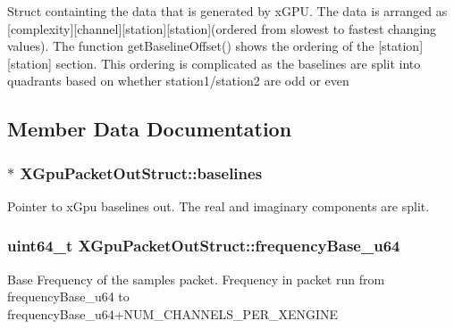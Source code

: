 Struct containting the data that is generated by x\+G\+PU. The data is arranged as \mbox{[}complexity\mbox{]}\mbox{[}channel\mbox{]}\mbox{[}station\mbox{]}\mbox{[}station\mbox{]}(ordered from slowest to fastest changing values). The function get\+Baseline\+Offset() shows the ordering of the \mbox{[}station\mbox{]}\mbox{[}station\mbox{]} section. This ordering is complicated as the baselines are split into quadrants based on whether station1/station2 are odd or even 

\subsection{Member Data Documentation}
\subsubsection[{\texorpdfstring{baselines}{baselines}}]{$\ast$ X\+Gpu\+Packet\+Out\+Struct\+::baselines}\hypertarget{struct_x_gpu_packet_out_struct_a225485074c9ce0158bf28c7e1cff158f}{}\label{struct_x_gpu_packet_out_struct_a225485074c9ce0158bf28c7e1cff158f}
Pointer to x\+Gpu baselines out. The real and imaginary components are split. 
\subsubsection[{\texorpdfstring{frequency\+Base\+\_\+u64}{frequencyBase_u64}}]{\setlength{\rightskip}{0pt plus 5cm}uint64\+\_\+t X\+Gpu\+Packet\+Out\+Struct\+::frequency\+Base\+\_\+u64}\hypertarget{struct_x_gpu_packet_out_struct_a5d10f9d8163cd660b367a088121666d8}{}\label{struct_x_gpu_packet_out_struct_a5d10f9d8163cd660b367a088121666d8}
Base Frequency of the samples packet. Frequency in packet run from frequency\+Base\+\_\+u64 to frequency\+Base\+\_\+u64+\+N\+U\+M\+\_\+\+C\+H\+A\+N\+N\+E\+L\+S\+\_\+\+P\+E\+R\+\_\+\+X\+E\+N\+G\+I\+NE 
